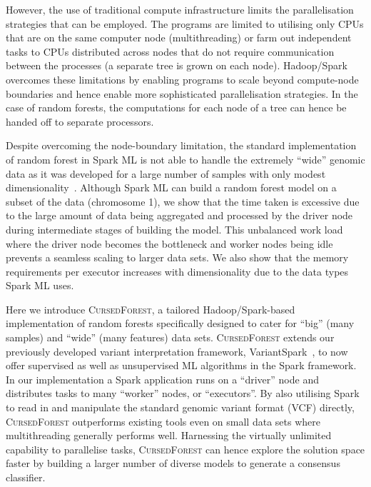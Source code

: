 \documentclass[10pt,letterpaper]{article}
\newcommand{\cursedforest}{\textsc{CursedForest}\xspace}
\begin{document}
However, the use of traditional compute infrastructure limits the parallelisation strategies that can be employed.  
The programs are limited to utilising only CPUs that are on the same computer node (multithreading) or
farm out independent tasks to CPUs distributed across nodes that do not require communication between the
processes (a separate tree is grown on each node).
Hadoop/Spark overcomes these limitations by enabling programs to
scale beyond compute-node boundaries and hence enable more sophisticated parallelisation strategies.  In the case of
random forests, the computations for each node of a tree can hence be handed off to separate processors.
 
Despite overcoming the node-boundary limitation, the standard implementation of random forest in Spark ML
is not able to handle the extremely ``wide'' genomic data as it was developed for a large number of samples
with only modest dimensionality~\cite{NIPS2016_6366}.  Although Spark ML can build a random forest model on a subset of the data (chromosome
1), we show that the time taken is excessive due to the large amount of data being aggregated and processed by the driver node during
intermediate stages of building the model.  This unbalanced work load where the driver
node becomes the bottleneck and worker nodes being idle prevents a seamless scaling to larger data sets. We also show that the memory
requirements per executor increases with dimensionality due to the data types Spark ML uses.%
  
Here we introduce \cursedforest, a tailored Hadoop/Spark-based implementation of random forests specifically designed to cater
for ``big'' (many samples) and ``wide'' (many features) data sets. 
\cursedforest extends our previously developed variant interpretation framework, VariantSpark~\cite{OBrien2015}, to now offer
supervised as well as unsupervised ML algorithms in the Spark framework.
In our implementation a Spark application runs on a ``driver'' node and
distributes tasks to many ``worker'' nodes, or ``executors''. 
By also utilising Spark to read in and manipulate the standard genomic variant format (VCF)
directly, \cursedforest outperforms existing tools even on small data sets where multithreading generally performs
well. Harnessing the virtually unlimited capability to parallelise tasks, \cursedforest can hence explore the solution 
space faster by building a larger number of diverse models to generate a consensus classifier. 
\end{document}
